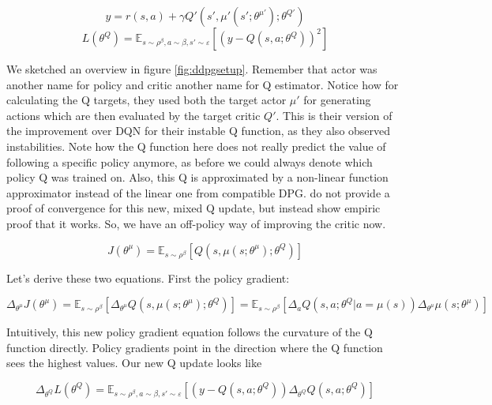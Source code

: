 \documentclass[hyperref,final,beleg]{cgvpub}
\begin{document}
\begin{equation}
y = r(s, a) + \gamma Q'(s', \mu'(s';\theta^{\mu'});\theta^{Q'})
\end{equation}
\begin{equation}
L(\theta^Q) = \mathbb{E}_{s \sim \rho^{\beta}, a \sim \beta, s' \sim \varepsilon}[(y - Q(s, a;\theta^Q))^2]
\end{equation}


We sketched an overview in figure \ref{fig:ddpgsetup}. Remember that actor was another name for policy and critic another name for Q estimator. Notice how for calculating the Q targets, they used both the target actor $\mu'$ for generating actions which are then evaluated by the target critic $Q'$. This is their version of the improvement over \ac{DQN} for their instable Q function, as they also observed instabilities. Note how the Q function here does not really predict the value of following a specific policy anymore, as before we could always denote which policy Q was trained on. Also, this Q is approximated by a non-linear function approximator instead of the linear one from compatible \ac{DPG}. \cite{lillicrapCONTINUOUSCONTROLDEEP2015} do not provide a proof of convergence for this new, mixed Q update, but instead show empiric proof that it works. So, we have an off-policy way of improving the critic now.

\begin{equation}
J(\theta^{\mu}) = \mathbb{E}_{s \sim \rho^{\beta}}[Q(s, \mu(s;\theta^{\mu});\theta^Q)]
\end{equation}

Let's derive these two equations. First the policy gradient:

\begin{equation}
\Delta_{\theta^{\mu}}J(\theta^{\mu}) = \mathbb{E}_{s \sim \rho^{\beta}}[\Delta_{\theta^{\mu}}Q(s, \mu(s;\theta^{\mu});\theta^Q)] = \mathbb{E}_{s \sim \rho^{\beta}}[\Delta_a Q(s, a;\theta^Q | a=\mu(s)) \Delta_{\theta^{\mu}}\mu(s;\theta^{\mu})]
\end{equation}

Intuitively, this new policy gradient equation follows the curvature of the Q function directly. Policy gradients point in the direction where the Q function sees the highest values. Our new Q update looks like

\begin{equation}
\Delta_{\theta^Q} L(\theta^Q) = \mathbb{E}_{s \sim \rho^{\beta}, a \sim \beta, s' \sim \varepsilon}[(y - Q(s, a;\theta^Q))\Delta_{\theta^Q}Q(s, a;\theta^Q)]
\end{equation}
\end{document}
